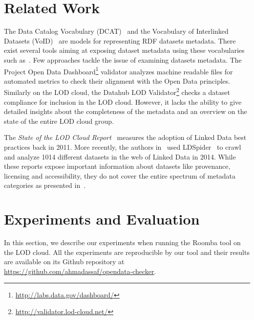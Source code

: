 \documentclass[runningheads,a4paper]{../../Tools/LaTEX/llncs}
\begin{document}
\section{Related Work}
\label{sec:related-work}
The Data Catalog Vocabulary (DCAT)~\cite{Erickson:DCV:14} and the Vocabulary of Interlinked Datasets (VoID)~\cite{Cyganiak:W3C:11} are models for representing RDF datasets metadata. There exist several tools aiming at exposing dataset metadata using these vocabularies such as~\cite{Bohm:WebSemJournal:11}.
Few approaches tackle the issue of examining datasets metadata. The Project Open Data Dashboard\footnote{\url{http://labs.data.gov/dashboard/}} validator analyzes machine readable files for automated metrics to check their alignment with the Open Data principles. Similarly on the LOD cloud, the Datahub LOD Validator\footnote{\url{http://validator.lod-cloud.net/}} checks a dataset compliance for inclusion in the LOD cloud. However, it lacks the ability to give detailed insights about the completeness of the metadata and an overview on the state of the entire LOD cloud group.

The \textit{State of the LOD Cloud Report}~\cite{Jentzsch:SOLOD:11} measures the adoption of Linked Data best practices back in 2011. More recently, the authors in~\cite{Schmachtenberg:ISWC:14} used LDSpider~\cite{Isele:ISWC:10} to crawl and analyze 1014 different datasets in the web of Linked Data in 2014. While these reports expose important information about datasets like provenance, licensing and accessibility, they do not cover the entire spectrum of metadata categories as presented in~\cite{Zaveri:SemWebJorunal:12}.


\section{Experiments and Evaluation}
\label{sec:experiment}
In this section, we describe our experiments when running the Roomba tool on the LOD cloud. All the experiments are reproducible by our tool and their results are available on its Github repository at \url{https://github.com/ahmadassaf/opendata-checker}.
\end{document}

